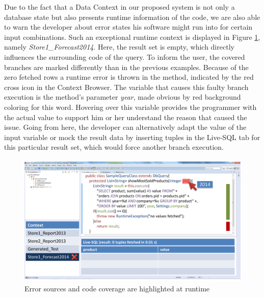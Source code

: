 Due to the fact that a Data Context in our proposed system is not only a database state but also presents runtime information of the code, we are also able to warn the developer about error states his software might run into for certain input combinations. Such an exceptional runtime context is displayed in Figure \ref{fig:final_prototype_error}, namely \emph{Store1\_Forecast2014}. Here, the result set is empty, which directly influences the surrounding code of the query. To inform the user, the covered branches are marked differently than in the previous examples. Because of the zero fetched rows a runtime error is thrown in the method, indicated by the red cross icon in the Context Browser. The variable that causes this faulty branch execution is the method's parameter \emph{year}, made obvious by red background coloring for this word. Hovering over this variable provides the programmer with the actual value to support him or her understand the reason that caused the issue. Going from here, the developer can alternatively adapt the value of the input variable or mock the result data by inserting tuples in the Live-SQL tab for this particular result set, which would force another branch execution.\\
\begin{figure}
\begin{centering}
    \includegraphics[width=1.0\linewidth]{images/error}
    \caption{Error sources and code coverage are highlighted at runtime}
    \label{fig:final_prototype_error}
\end{centering}
\end{figure}